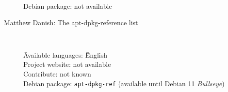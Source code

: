 \documentclass[10pt]{article}
\begin{document}
\begin{description}
\begin{tabbing}
            \> Debian package: \> \> not available \\
        \end{tabbing}

    \item[Matthew Danish: The apt-dpkg-reference list] ~ \\
        \begin{tabbing}
            \= Available languages: \= \= English \\
            \> Project website: \> \> not available \\
            \> Contribute: \> \> not known \\
            
            \> Debian package: \> \> \texttt{apt-dpkg-ref} (available until Debian 11 \textit{Bullseye})
        \end{tabbing}
    \end{description}
\end{document}
